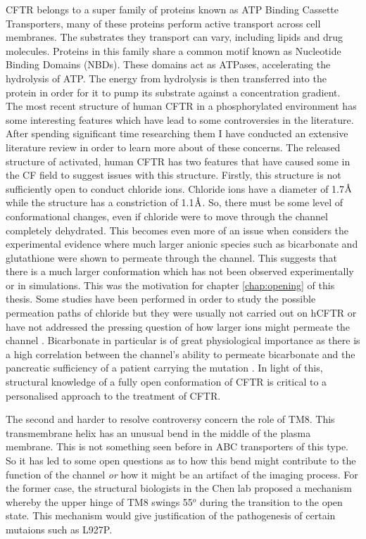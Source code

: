 CFTR belongs to a super family of proteins known as ATP Binding Cassette Transporters,  many of these proteins perform active transport across cell membranes. The substrates they transport can vary, including lipids and drug molecules. Proteins in this family share a common motif known as Nucleotide Binding Domains (NBDs). These domains act as ATPases, accelerating the hydrolysis of ATP. The energy from hydrolysis is then transferred into the protein in order for it to pump its substrate against a concentration gradient. 
The most recent structure of human CFTR in a phosphorylated environment has some interesting features which have lead to some controversies in the literature. After spending significant time researching them I have conducted an extensive literature review in order to learn more about of these concerns. The released structure of activated, human CFTR has two features that have caused some in the CF field to suggest issues with this structure. Firstly, this structure is not sufficiently open to conduct chloride ions. Chloride ions have a diameter of 1.7$\textup{\AA}$ while the structure has a constriction of 1.1$\textup{\AA}$\cite{zhang2018}. So, there must be some level of conformational changes, even if chloride were to move through the channel completely dehydrated. This becomes even more of an issue when considers the experimental evidence where much larger anionic species such as bicarbonate and glutathione were shown to permeate through the channel\cite{kogan2003}. This suggests that there is a much larger conformation which has not been observed experimentally or in simulations. This was the motivation for chapter \ref{chap:opening} of this thesis. Some studies have been performed in order to study the possible permeation paths of chloride but they were usually not carried out on hCFTR or have not addressed the pressing question of how larger ions might permeate the channel \cite{farkas2020, zeng2021}. Bicarbonate in particular is of great physiological importance as there is a high correlation between the channel's ability to permeate bicarbonate and the pancreatic sufficiency of a patient carrying the mutation \cite{}. In light of this, structural knowledge of a fully open conformation of CFTR is critical to a personalised approach to the treatment of CFTR.

The second and harder to resolve controversy concern the role of TM8. This transmembrane helix has an unusual bend in the middle of the plasma membrane. This is not something seen before in ABC transporters of this type. So it has led to some open questions as to how this bend might contribute to the function of the channel \textit{or} how it might be an artifact of the imaging process. For the former case, the structural biologists in the Chen lab proposed a mechanism whereby the upper hinge of TM8 swings 55$^o$ during the transition to the open state. This mechanism would give justification of the pathogenesis of certain mutaions such as L927P. 


